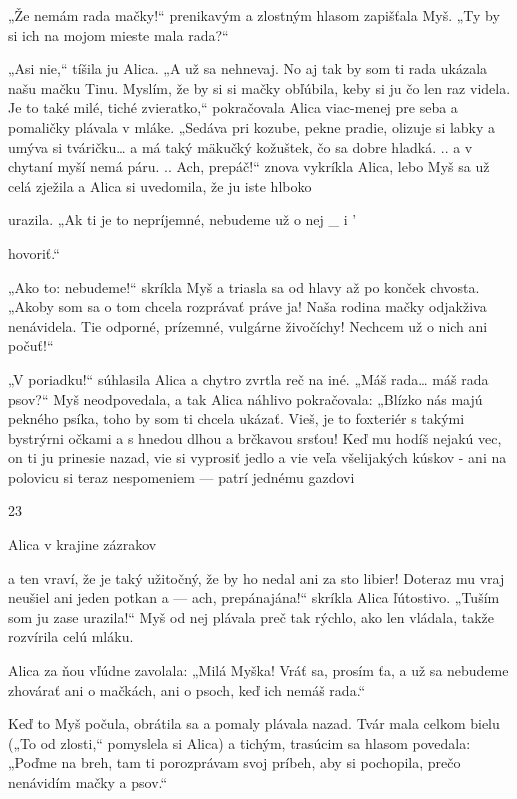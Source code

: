 \documentclass[12pt]{article}
\begin{document}
\begin{Parallel}[p]{}{}
{„Že nemám rada mačky!“ prenikavým a zlostným hlasom
zapišťala Myš. „Ty by si ich na mojom mieste mala rada?“

„Asi nie,“ tíšila ju Alica. „A už sa nehnevaj. No aj tak by
som ti rada ukázala našu mačku Tinu. Myslím, že by si si
mačky obľúbila, keby si ju čo len raz videla. Je to také milé,
tiché zvieratko,“ pokračovala Alica viac-menej pre seba
a pomaličky plávala v mláke. „Sedáva pri kozube, pekne
pradie, olizuje si labky a umýva si tváričku… a má taký
mäkučký kožuštek, čo sa dobre hladká. .. a v chytaní myší
nemá páru. .. Ach, prepáč!“ znova vykríkla Alica, lebo Myš
sa už celá zježila a Alica si uvedomila, že ju iste hlboko

urazila. „Ak ti je to nepríjemné, nebudeme už o nej _ i '

hovoriť.“

„Ako to: nebudeme!“ skríkla Myš a triasla sa od hlavy až
po konček chvosta. „Akoby som sa o tom chcela rozprávať
práve ja! Naša rodina mačky odjakživa nenávidela. Tie
odporné, prízemné, vulgárne živočíchy! Nechcem už o nich
ani počuť!“

„V poriadku!“ súhlasila Alica a chytro zvrtla reč na iné.
„Máš rada… máš rada psov?“ Myš neodpovedala, a tak
Alica náhlivo pokračovala: „Blízko nás majú pekného
psíka, toho by som ti chcela ukázať. Vieš, je to foxteriér
s takými bystrýrni očkami a s hnedou dlhou a brčkavou
srsťou! Keď mu hodíš nejakú vec, on ti ju prinesie nazad, vie
si vyprosiť jedlo a vie veľa všelijakých kúskov - ani na
polovicu si teraz nespomeniem — patrí jednému gazdovi

23

 

 

Alica v krajine zázrakov

a ten vraví, že je taký užitočný, že by ho nedal ani za sto
libier! Doteraz mu vraj neušiel ani jeden potkan a — ach,
prepánajána!“ skríkla Alica ľútostivo. „Tuším som ju zase
urazila!“ Myš od nej plávala preč tak rýchlo, ako len vládala,
takže rozvírila celú mláku.

Alica za ňou vľúdne zavolala: „Milá Myška! Vráť sa,
prosím ťa, a už sa nebudeme zhovárať ani o mačkách, ani
o psoch, keď ich nemáš rada.“

Keď to Myš počula, obrátila sa a pomaly plávala nazad.
Tvár mala celkom bielu („To od zlosti,“ pomyslela si Alica)
a tichým, trasúcim sa hlasom povedala: „Poďme na breh,
tam ti porozprávam svoj príbeh, aby si pochopila, prečo
nenávidím mačky a psov.“

}
\end{Parallel}
\end{document}
